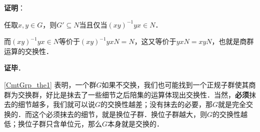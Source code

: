 \textbf{证明}：

任取$x, y\in G$，则$G'\subseteq N$当且仅当$(xy)^{-1}yx\in N$．

而$(xy)^{-1}yx\in N$等价于$(xy)^{-1}yxN=N$，这又等价于$yxN=xyN$，也就是商群运算的交换性．



\textbf{证毕}．

\autoref{CmtGrp_the1} 表明，一个群$G$如果不交换，我们也可能找到一个正规子群使其商群为交换群，好比是抹去了一些细节之后陪集的运算体现出交换性．当然，\textbf{必须}抹去的细节越多，我们就可以说$G$的交换性越差；没有抹去的必要，那$G$就是完全交换的．而这个必须抹去的细节，就是换位子群．换位子群越大，则$G$的交换性越低；换位子群只含单位元，那么$G$本身就是交换的．












